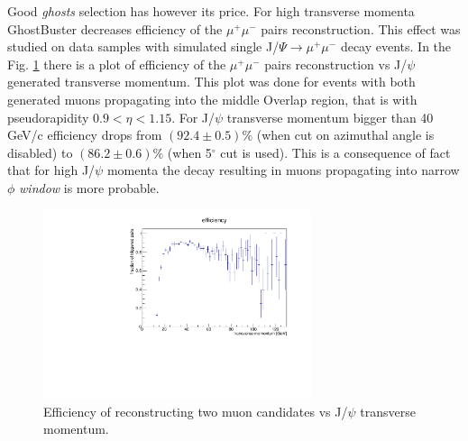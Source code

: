 Good \textit{ghosts} selection has however its price. For high transverse momenta GhostBuster decreases efficiency of the $\mu^{+}\mu^{-}$ pairs reconstruction. This effect was studied on data samples with simulated single J/$\Psi \rightarrow \mu^{+}\mu^{-}$ decay events. In the Fig. \ref{divmom} there is a plot of efficiency of the $\mu^{+}\mu^{-}$ pairs reconstruction vs J/$\psi$ generated transverse momentum. This plot was done for events with both generated muons propagating into the middle Overlap region, that is with pseudorapidity $0.9 < \eta < 1.15$. For J/$\psi$ transverse momentum bigger than 40 GeV/c efficiency drops from $(92.4\pm0.5)\%$ (when cut on azimuthal angle is disabled) to $(86.2\pm0.6)\%$ (when 5$^\circ$\textrm{ }cut is used). This is a consequence of fact that for high J/$\psi$ momenta the decay resulting in muons propagating into narrow $\phi$ \textit{window} is more probable.
\begin{figure}[t]
\centering
\includegraphics[width=0.7\textwidth]{efficiency_GB_5.pdf}
\caption{Efficiency of reconstructing two muon candidates vs J/$\psi$ transverse momentum.}
\label{divmom}
\end{figure} 
